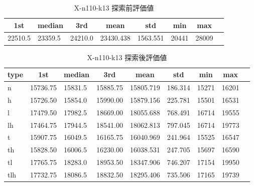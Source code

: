 \begin{table}[htbp]
    \centering
    \caption{X-n110-k13 探索前評価値}
    \begin{tabular}{|l|l|l|l|l|l|l|l|}\hline
    \multicolumn{1}{|c|}{\textbf{1st}}
    &\multicolumn{1}{c|}{\textbf{median}}
    &\multicolumn{1}{c|}{\textbf{3rd}}
    &\multicolumn{1}{c|}{\textbf{mean}}
    &\multicolumn{1}{c|}{\textbf{std}}
    &\multicolumn{1}{c|}{\textbf{min}}
    &\multicolumn{1}{c|}{\textbf{max}}\\\hline
	22510.5 & 23359.5 & 24210.0 & 23430.438 & 1563.551 & 20441 & 28009\\\hline
	\end{tabular}
\end{table}
\begin{table}[htbp]
    \centering
    \caption{X-n110-k13 探索後評価値}
    \begin{tabular}{|l|l|l|l|l|l|l|l|l|}\hline
    \multicolumn{1}{|c|}{\textbf{type}}
    &\multicolumn{1}{|c|}{\textbf{1st}}
    &\multicolumn{1}{c|}{\textbf{median}}
    &\multicolumn{1}{c|}{\textbf{3rd}}
    &\multicolumn{1}{c|}{\textbf{mean}}
    &\multicolumn{1}{c|}{\textbf{std}}
    &\multicolumn{1}{c|}{\textbf{min}}
    &\multicolumn{1}{c|}{\textbf{max}}\\\hline
	n & 15736.75 & 15831.5 & 15885.75 & 15805.719 & 186.314 & 15271 & 16201\\\hline
	h & 15726.50 & 15854.0 & 15990.00 & 15879.156 & 225.781 & 15501 & 16531\\\hline
	l & 17479.50 & 17982.5 & 18669.00 & 18055.688 & 768.491 & 16714 & 19555\\\hline
	lh & 17464.75 & 17944.5 & 18541.00 & 18062.813 & 797.045 & 16714 & 19773\\\hline
	t & 15907.75 & 16049.5 & 16165.75 & 16040.969 & 241.964 & 15525 & 16547\\\hline
	th & 15828.50 & 16006.5 & 16230.00 & 16038.531 & 247.705 & 15697 & 16590\\\hline
	tl & 17765.75 & 18283.0 & 18953.50 & 18347.906 & 746.207 & 17154 & 19950\\\hline
	tlh & 17732.75 & 18086.5 & 18832.50 & 18295.406 & 735.506 & 17165 & 19739\\\hline
	\end{tabular}
\end{table}
